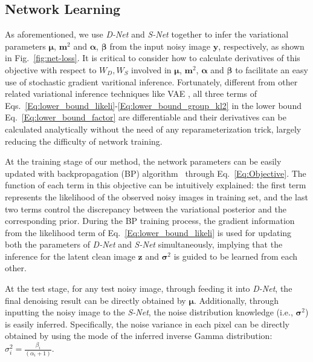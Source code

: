 \documentclass{article}
\begin{document}
\vspace{-4mm}\subsection{Network Learning} \label{sec:inference}\vspace{-2mm}
As aforementioned, we use \textit{D-Net} and \textit{S-Net} together to infer
the variational parameters $\bm{\mu}$, $\bm{m}^2$ and $\bm{\alpha}$, $\bm{\beta}$ from the input
noisy image $\bm{y}$, respectively, as shown in Fig.~\ref{fig:net-loss}. It is critical to consider how to
calculate derivatives of this objective with respect to $W_D,W_S$ involved in $\bm{\mu}$, $\bm{m}^2$,
$\bm{\alpha}$ and $\bm{\beta}$ to facilitate an easy use of stochastic gradient varitional inference. Fortunately,
different from other related variational inference techniques
like VAE \cite{kingma2013auto}, all three terms of Eqs.~\eqref{Eq:lower_bound_likeli}-\eqref{Eq:lower_bound_group_kl2}
in the lower bound Eq.~\eqref{Eq:lower_bound_factor} are differentiable and their derivatives can be calculated
analytically without the need of any reparameterization trick, largely reducing the difficulty of network
training.

At the training stage of our method, the network parameters can be easily updated with backpropagation (BP)
algorithm~\cite{goodfellow2016deep} through Eq.~\eqref{Eq:Objective}. The function of each term in this objective can
be intuitively explained: the first term represents the likelihood of the observed noisy images in training set,
and the last two terms control the discrepancy between the variational posterior and the corresponding prior.
During the BP training process, the gradient information from the likelihood term of Eq.~\eqref{Eq:lower_bound_likeli}
is used for updating both the parameters of \textit{D-Net} and \textit{S-Net} simultaneously, implying that the
inference for the latent clean image $\bm{z}$ and $\bm{\sigma}^2$ is guided to be learned from each other.

At the test stage, for any test noisy image, through feeding it into \textit{D-Net}, the final denoising
result can be directly obtained by $\bm{\mu}$. Additionally, through inputting the noisy image to the \textit{S-Net},
the noise distribution knowledge (i.e., $\bm{\sigma}^2$) is easily inferred. Specifically, the noise variance in
each pixel can be directly obtained by using the mode of the inferred inverse Gamma
distribution: $\sigma_i^2=\frac{\beta_i}{(\alpha_i+1)}$.
\end{document}
